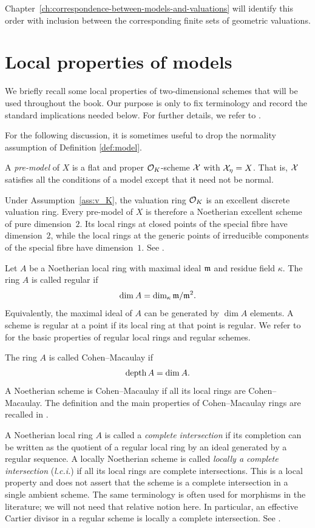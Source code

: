 Chapter~\ref{ch:correspondence-between-models-and-valuations} will identify this order with inclusion between the corresponding finite sets of geometric valuations.

\section{Local properties of models}\label{sec:local-properties-of-models}

We briefly recall some local properties of two-dimensional schemes that will be
used throughout the book.
Our purpose is only to fix terminology and record the standard implications needed
below.
For further details, we refer to \cite[\S 4.2, \S 6.3, \S 6.4, \S 8.2.2, and
\S 8.3.1]{Liu}.

For the following discussion, it is sometimes useful to drop the normality assumption of Definition \ref{def:model}.

\begin{definition}\label{def:pre-model}
    A \textit{pre-model} of $X$ is a flat and proper $\mathcal O_K$-scheme $\mathcal X$ with $\mathcal X_\eta = X$.
    That is, $\mathcal X$ satisfies all the conditions of a model except that it need not be normal.
\end{definition}

Under Assumption~\ref{ass:v_K}, the valuation ring $\mathcal O_K$ is an excellent discrete
valuation ring.
Every pre-model of $X$ is therefore a Noetherian excellent scheme of pure
dimension~$2$.
Its local rings at closed points of the special fibre have dimension~$2$, while
the local rings at the generic points of irreducible components of the special
fibre have dimension~$1$.
See \cite[\S 8.2.3 and \S 8.3.1]{Liu}.

Let $A$ be a Noetherian local ring with maximal ideal $\mathfrak m$ and residue
field $\kappa$.
The ring $A$ is called regular if
\[
    \operatorname{dim_{}} A
    =
    \operatorname{dim_{\kappa}} \mathfrak m/\mathfrak m^2.
\]
Equivalently, the maximal ideal of $A$ can be generated by $\dim{} A$ elements.
A scheme is regular at a point if its local ring at that point is regular.
We refer to \cite[\S 4.2]{Liu} for the basic properties of regular local rings
and regular schemes.

The ring $A$ is called Cohen--Macaulay if
\[
    \operatorname{depth}{A}=\operatorname{dim_{}} A.
\]
A Noetherian scheme is Cohen--Macaulay if all its local rings are
Cohen--Macaulay.
The definition and the main properties of Cohen--Macaulay rings are recalled in
\cite[\S 8.2.2]{Liu}.

A Noetherian local ring $A$ is called a \textit{complete intersection} if
its completion can be written as the quotient of a regular local ring by an
ideal generated by a regular sequence.
A locally Noetherian scheme is called \textit{locally a complete intersection} (\emph{l.c.i.})
if all its local rings are complete intersections.
This is a local property and does not assert that the scheme is a complete
intersection in a single ambient scheme.
The same terminology is often used for morphisms in the literature; we will
not need that relative notion here.
In particular, an effective Cartier divisor in a regular scheme is locally a
complete intersection.
See \cite[\S 6.3]{Liu}.

